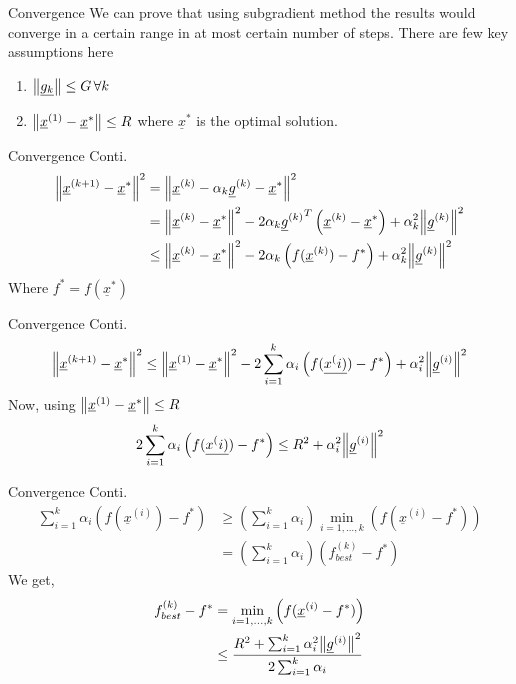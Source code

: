 \documentclass{beamer}
\renewcommand{\vec}[1]{\underline{#1}}
\begin{document}
\begin{frame}{Convergence}
    We can prove that using subgradient method the results would converge in a certain range in at most certain number of steps. There are few key assumptions here
    \begin{enumerate}
        \item $\norm{\vec{g_k}} \leq G\, \forall k$
        \item $\norm{\vec{x}^{(1)}-\vec{x}^*} \leq R$ where $\vec{x}^*$ is the optimal solution.
    \end{enumerate}
\end{frame}
\begin{frame}{Convergence Conti.}
    \begin{align}
        \norm{\vec{x}^{(k+1)}-\vec{x}^*}^2 &= \norm{\vec{x}^{(k)}-\alpha_k\vec{g}^{(k)}-\vec{x}^*}^2\\
        &= \norm{\vec{x}^{(k)}-\vec{x}^*}^2 - 2\alpha_k{\vec{g}^{(k)}}^T\left(\vec{x}^{(k)}-\vec{x}^*\right)+\alpha_k^2\norm{\vec{g}^{(k)}}^2\\
        &\leq \norm{\vec{x}^{(k)}-\vec{x}^*}^2 - 2\alpha_k\left(f(\vec{x}^{(k)})-f^*\right)+\alpha_k^2\norm{\vec{g}^{(k)}}^2
    \end{align}
    Where $f^* = f(\vec{x}^*)$
\end{frame}
\begin{frame}{Convergence Conti.}
    \begin{align}
        \norm{\vec{x}^{(k+1)}-\vec{x}^*}^2 \leq \norm{\vec{x}^{(1)}-\vec{x}^*}^2 - 2\sum_{i=1}^{k}\alpha_i\left(f(\vec{x^(i)})-f^*\right)+\alpha_i^2\norm{\vec{g}^{(i)}}^2
    \end{align}
    Now, using $\norm{\vec{x}^{(1)}-\vec{x}^*} \leq R$
    \begin{align}
        2\sum_{i=1}^{k}\alpha_i\left(f(\vec{x^(i)})-f^*\right) \leq R^2 + \alpha_i^2\norm{\vec{g}^{(i)}}^2
    \end{align}
\end{frame}

\begin{frame}{Convergence Conti.}
    \begin{align}
        \sum_{i=1}^{k}\alpha_i\left(f(\vec{x}^{(i)})-f^*\right)&\geq \left(\sum_{i=1}^{k}\alpha_i\right) \min_{i=1,\dots,k}\left(f(\vec{x}^{(i)}-f^*)\right)\\ 
        &=\left(\sum_{i=1}^{k}\alpha_i\right)(f_{best}^{(k)}-f^*)\nonumber
    \end{align}
    We get,
    \begin{align}
        f_{best}^{(k)}-f^* &= \min_{i=1,\dots,k}\left(f(\vec{x}^{(i)}-f^*)\right)\\
        &\leq \frac{R^2+\sum_{i=1}^{k}\alpha_i^2\norm{\vec{g}^{(i)}}^2}{2\sum_{i=1}^{k}\alpha_i}\nonumber
    \end{align}
\end{frame}
\end{document}
